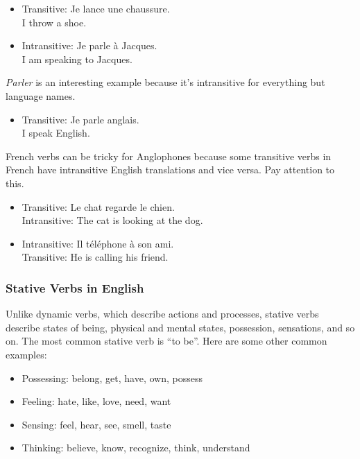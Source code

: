 \begin{itemize}
  \item  Transitive: Je lance une chaussure. \\ I throw a shoe.
  \item  Intransitive: Je parle {\`a} Jacques. \\ I am speaking to Jacques.
\end{itemize}

\textit{Parler} is an interesting example because it's intransitive for everything but language names.

\begin{itemize}
  \item  Transitive: Je parle anglais. \\ I speak English.
\end{itemize}

French verbs can be tricky for Anglophones because some transitive verbs in French have intransitive English translations and vice versa. Pay attention to this.

\begin{itemize}
  \item  Transitive: Le chat regarde le chien. \\ Intransitive: The cat is looking at the dog.
  \item  Intransitive: Il t{\'e}l{\'e}phone {\`a} son ami. \\ Transitive: He is calling his friend.
\end{itemize}

\subsubsection{Stative Verbs in English}

Unlike dynamic verbs, which describe actions and processes, stative verbs describe states of being, physical and mental states, possession, sensations, and so on. The most common stative verb is ``to be''. Here are some other common examples:

\begin{itemize}
  \item  Possessing: belong, get, have, own, possess
  \item  Feeling: hate, like, love, need, want
  \item  Sensing: feel, hear, see, smell, taste
  \item  Thinking: believe, know, recognize, think, understand
\end{itemize}

